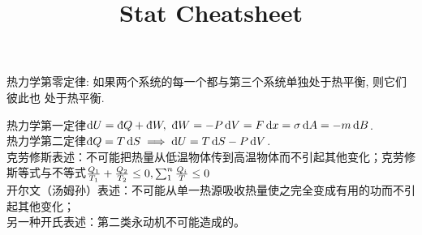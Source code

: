 \documentclass[UTF8,8pt]{ctexart}
\title{Stat Cheatsheet}
\begin{document}
 
\leftmargini=5mm
\raggedright
\footnotesize
\begin{multicols}{3}
        热力学第零定律: 如果两个系统的每一个都与第三个系统单独处于热平衡, 则它们彼此也
        处于热平衡.
    
        热力学第一定律$\d U=\dbar Q+\dbar W,\ \dbar W=-P\d V=F\d x=\sg \d A = -m\d B$. \\
        热力学第二定律$\dbar Q = T\d S \ip \d U = T\d S -P\d V$. \\
        克劳修斯表述：不可能把热量从低温物体传到高温物体而不引起其他变化；克劳修斯等式与不等式$\frac{Q_{1}}{T_{1}}+\frac{Q_{2}}{T_{2}} \leq 0,\sum_1^n\frac{Q_i}{T}\leq 0$\\
        开尔文（汤姆孙）表述：不可能从单一热源吸收热量使之完全变成有用的功而不引起其他变化；\\
        另一种开氏表述：第二类永动机不可能造成的。
        

\end{multicols}
\end{document}
